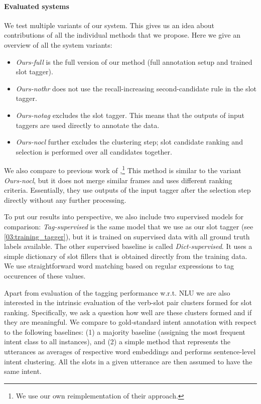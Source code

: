 \paragraph{Evaluated systems}
We test multiple variants of our system.
This gives us an idea about contributions of all the individual methods that we propose.
Here we give an overview of all the system variants:
\begin{itemize}[nosep,leftmargin=10pt]
    \item \textit{Ours-full} is the full version of our method (full annotation setup and trained slot tagger).
    \item \textit{Ours-nothr} does not use the recall-increasing second-candidate rule in the slot tagger.
    \item \textit{Ours-notag} excludes the slot tagger. This means that the outputs of input taggers are used directly to annotate the data.
    \item \textit{Ours-nocl} further excludes the clustering step; slot candidate ranking and selection is performed over all candidates together.
\end{itemize}
We also compare to previous work of \citet{chen2014leveraging},\footnote{We use our own reimplementation of their approach.}
This method is similar to the variant \textit{Ours-nocl}, but it does not merge similar frames and uses different ranking criteria.
Essentially, they use outputs of the input tagger after the selection step directly without any further processing.

To put our results into perspective, we also include two supervised models for comparison:
\emph{Tag-supervised} is the same model that we use as our slot tagger (see \ref{03:training_tagger}), but it is trained on supervised data with all ground truth labels available.
The other supervised baseline is called \emph{Dict-supervised}.
It uses a simple dictionary of slot fillers that is obtained directly from the training data.
We use straightforward word matching based on regular expressions to tag occurences of these values.


Apart from evaluation of the tagging performance w.r.t. NLU we are also interested in the intrinsic evaluation of the verb-slot pair clusters formed for slot ranking.
Specifically, we ask a question how well are these clusters formed and if they are meaningful.
We compare to gold-standard intent annotation with respect to the following baselines: (1) a majority baseline (assigning the most frequent intent class to all instances), and (2) a simple method that represents the utterances as averages of respective word embeddings and performs sentence-level intent clustering.
All the slots in a given utterance are then assumed to have the same intent.


